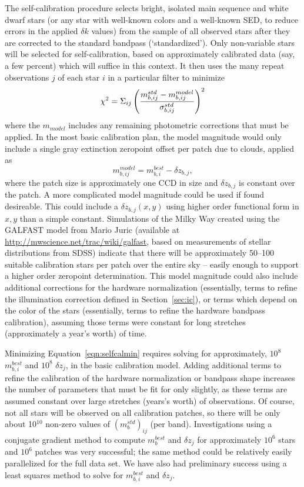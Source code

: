 \documentclass[12pt,preprint]{aastex}
\begin{document}
The self-calibration procedure selects bright, isolated main sequence
and white dwarf stars (or any star with well-known colors and a
well-known SED, to reduce errors in the applied
$\delta k$ values) from the sample of all observed stars after they are
corrected to the standard bandpass (`standardized'). Only non-variable stars will be
selected for self-calibration, based on approximately calibrated data
(say, a few percent) which will suffice in this context. It then uses
the many repeat observations $j$ of each star $i$ in a particular filter to minimize
\begin{equation}
\label{eqn:selfcalmin}
\chi^2 = \Sigma_{ij} \left(  { m_{b,ij}^{std} - m_{b,ij}^{model} \over
    \sigma_{b,ij}^{std} } \right)^2
\end{equation}
where the $m_{model}$ includes any remaining photometric corrections
that must be applied. In the most basic calibration plan, the model
magnitude would only include a single gray extinction zeropoint offset
per patch due to clouds, applied as
\begin{equation}
\label{eqn:zp}
m^{model}_{b,ij} = m^{best}_{b,i} - \delta z_{b,j},
\end{equation}
where the patch size is approximately one CCD in size and $\delta
z_{b,j}$ is constant over the patch. A more complicated model
magnitude could be used if found desireable. This could include a
$\delta z_{b,j}(x,y)$ using higher order functional form in $x,y$ than
a simple constant.  Simulations of the Milky Way created using the
GALFAST model from Mario Juric (available at
\url{http://mwscience.net/trac/wiki/galfast}, based on measurements of
stellar distributions from SDSS) indicate that there will be
approximately 50--100 suitable calibration stars per patch over the
entire sky -- easily enough to support a higher order zeropoint
determination.  This model magnitude could also include additional
corrections for the hardware normalization (essentially, terms to
refine the illumination correction defined in Section~\ref{sec:ic}),
or terms which depend on the color of the stars (essentially, terms to
refine the hardware bandpass calibration), assuming those terms were
constant for long stretches (approximately a year's worth) of time.

Minimizing Equation~\ref{eqn:selfcalmin} requires solving for
approximately, $10^8$ $m_{b,i}^{best}$ and $10^8$ $\delta z_j$, in the
basic calibration model. Adding additional terms to refine the
calibration of the hardware normalization or bandpass shape increases
the number of parameters that must be fit for only slightly, as these
terms are assumed constant over large stretches (years's worth) of observations. Of
course, not all stars will be observed on all calibration patches, so
there will be only about 10$^{10}$ non-zero values of
$(m_b^{std})_{ij}$ (per band). Investigations using a conjugate
gradient method to compute $m_{b}^{best}$ and $\delta z_j$ for
approximately $10^6$ stars and $10^6$ patches was very successful; the
same method could be relatively easily parallelized for the full data
set.  We have also had preliminary success using a least squares
method to solve for $m_{b,i}^{best}$ and $\delta z_j$. 
\end{document}
